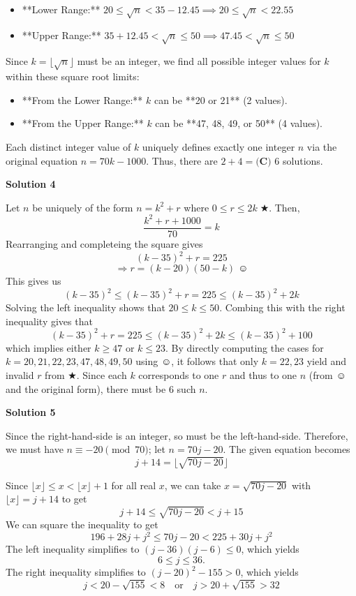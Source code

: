 \begin{enumerate}
 
            \begin{itemize}
        \item **Lower Range:** $20 \leq \sqrt{n} < 35 - 12.45 \implies 20 \leq \sqrt{n} < 22.55$
        \item **Upper Range:** $35 + 12.45 < \sqrt{n} \leq 50 \implies 47.45 < \sqrt{n} \leq 50$
            \end{itemize}
            Since $k = \lfloor \sqrt{n} \rfloor$ must be an integer, we find all possible integer values for $k$ within these square root limits:

 
            \begin{itemize}
        \item **From the Lower Range:** $k$ can be **20 or 21** (2 values).
        \item **From the Upper Range:** $k$ can be **47, 48, 49, or 50** (4 values).
            \end{itemize}
            Each distinct integer value of $k$ uniquely defines exactly one integer $n$ via the original equation $n = 70k - 1000$. Thus, there are $2 + 4 = \boxed{\textbf{(C) } 6}$ solutions.

 



\textbf{Solution 4}

Let $n$ be uniquely of the form $n=k^2+r$ where $0 \le r \le 2k \; \bigstar$. Then, 
 \[\frac{k^2+r+1000}{70} = k\] Rearranging and completeing the square gives 
 \[(k-35)^2 + r = 225\] 
 \[\Rightarrow r = (k-20)(50-k)\; \smiley\] This gives us 
 \[(k-35)^2 \le (k-35)^2+r=225 \le (k-35)^2 + 2k\] Solving the left inequality shows that $20 \le k \le 50$. Combing this with the right inequality gives that 
 \[(k-35)^2+r=225 \le (k-35)^2 + 2k \le (k-35)^2+100\] which implies either $k \ge 47$ or $k \le 23$. By directly computing the cases for $k = 20, 21, 22, 23, 47, 48, 49, 50$ using $\smiley$, it follows that only $k = 22, 23$ yield and invalid $r$ from $\bigstar$. Since each $k$ corresponds to one $r$ and thus to one $n$ (from $\smiley$ and the original form), there must be 6 such $n$.  

 



\textbf{Solution 5}

Since the right-hand-side is an integer, so must be the left-hand-side. Therefore, we must have $n\equiv -20\pmod{70}$; let $n=70j-20$. The given equation becomes
 \[j+14 = \lfloor \sqrt{70j-20} \rfloor\]

 Since $\lfloor x \rfloor \leq x < \lfloor x \rfloor +1$ for all real $x$, we can take $x=\sqrt{70j-20}$ with $\lfloor x \rfloor =j+14$ to get
 \[j+14 \leq \sqrt{70j-20} < j+15\]We can square the inequality to get
 \[196+28j+j^{2} \leq 70j-20 < 225 + 30j + j^{2}\]The left inequality simplifies to $(j-36)(j-6) \leq 0$, which yields 
 \[6 \le j \le 36.\]The right inequality simplifies to $(j-20)^2 - 155 > 0$, which yields 
 \[j < 20 - \sqrt{155} < 8 \quad \text{or} \quad j > 20 + \sqrt{155} > 32\] 


\end{enumerate}
